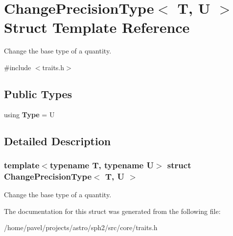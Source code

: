 \hypertarget{structChangePrecisionType}{}\section{Change\+Precision\+Type$<$ T, U $>$ Struct Template Reference}
\label{structChangePrecisionType}


Change the base type of a quantity.  




{\ttfamily \#include $<$traits.\+h$>$}

\subsection*{Public Types}
\begin{DoxyCompactItemize}
\item 
\hypertarget{structChangePrecisionType_a9e2433a4bf8a765a86d4834f962d047d}{}\label{structChangePrecisionType_a9e2433a4bf8a765a86d4834f962d047d} 
using {\bfseries Type} = U
\end{DoxyCompactItemize}


\subsection{Detailed Description}
\subsubsection*{template$<$typename T, typename U$>$\newline
struct Change\+Precision\+Type$<$ T, U $>$}

Change the base type of a quantity. 

The documentation for this struct was generated from the following file\+:\begin{DoxyCompactItemize}
\item 
/home/pavel/projects/astro/sph2/src/core/traits.\+h\end{DoxyCompactItemize}
